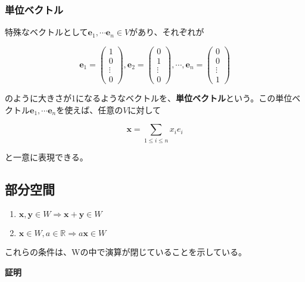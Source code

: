\documentclass[dvipdfmx,autodetect-engine]{jsarticle}
\begin{document}
\subsubsection{単位ベクトル}\label{subsection:unitVector}

特殊なベクトルとして$\bm{e}_1, \cdots \bm{e}_n \in V$があり、それぞれが

$$
\bm{e}_1 = \begin{pmatrix}
1 \\
0 \\
\vdots \\
0
\end{pmatrix},
\bm{e}_2 = \begin{pmatrix}
0 \\
1 \\
\vdots \\
0
\end{pmatrix}, 
\cdots, 
\bm{e}_n = \begin{pmatrix}
0 \\
0 \\
\vdots \\
1
\end{pmatrix}
$$

のように大きさが1になるようなベクトルを、{\bf 単位ベクトル}という。この単位ベクトル$\bm{e}_1, \cdots \bm{e}_n$を使えば、任意の$V$に対して

$$
\bm{x} = \sum_{1 \leq i \leq n} x_ie_i
$$

と一意に表現できる。

\subsection{部分空間}

\label{defi:subspace}

\begin{enumerate}
\renewcommand{\labelenumi}{(\arabic{enumi})}
\item $\bm{x}, \bm{y} \in W \Rightarrow \bm{x} + \bm{y} \in W$
\item $\bm{x} \in W, a \in \mathbb{R} \Rightarrow a\bm{x} \in W$
\end{enumerate}

これらの条件は、Wの中で演算が閉じていることを示している。


{\bf 証明}
\end{document}

